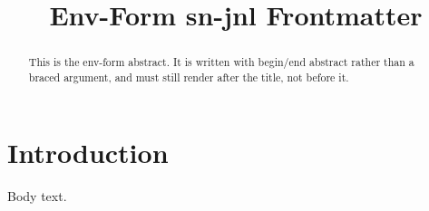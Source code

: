\documentclass[pdflatex,sn-mathphys]{sn-jnl}
\begin{document}
\title{Env-Form sn-jnl Frontmatter}
\author*{ }
\begin{abstract}
This is the env-form abstract. It is written with begin/end abstract rather than a braced argument, and must still render after the title, not before it.
\end{abstract}
\maketitle
\section{Introduction}
Body text.
\end{document}
